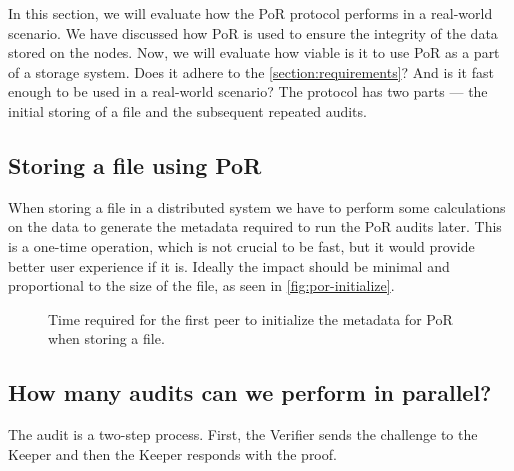 In this section, we will evaluate how the PoR protocol performs in a real-world scenario.
We have discussed how PoR is used to ensure the integrity of the data stored on the nodes.
Now, we will evaluate how viable is it to use PoR as a part of a storage system.
Does it adhere to the \autoref{section:requirements}?
And is it fast enough to be used in a real-world scenario?
The protocol has two parts --- the initial storing of a file and the subsequent repeated audits.

\subsection{Storing a file using PoR}

When storing a file in a distributed system we have to perform some calculations on the data
to generate the metadata required to run the PoR audits later.
This is a one-time operation, which is not crucial to be fast,
but it would provide better user experience if it is.
Ideally the impact should be minimal and proportional to the size of the file,
as seen in \autoref{fig:por-initialize}.

\begin{figure}
  \myfloatalign
  \caption{Time required for the first peer to initialize the metadata for PoR when storing a file.}
  \label{fig:por-initialize}
\end{figure}

\subsection{How many audits can we perform in parallel?}

The audit is a two-step process.
First, the Verifier sends the challenge to the Keeper and then the Keeper responds with the proof.

